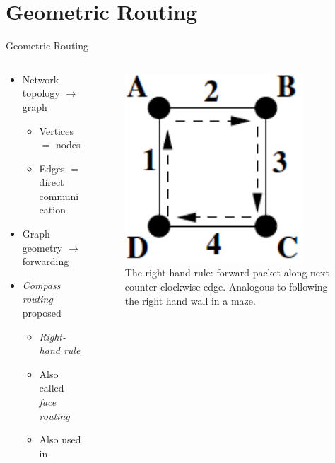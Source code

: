 \documentclass[pdftex]{beamer}
\begin{document}

\section{Geometric Routing}

\begin{frame}{Geometric Routing}
\begin{columns}
\begin{column}{.5\textwidth}
	\begin{itemize}
		\item Network topology $\rightarrow$ graph
			\begin{itemize}
				\item Vertices $=$ nodes
				\item Edges $=$ direct communication
			\end{itemize}
		\pause
		\item Graph geometry $\rightarrow$ forwarding
		\pause
		\item \emph{Compass routing} proposed \cite{Kranakis99compassrouting}
		\begin{itemize}
			\item \emph{Right-hand rule}
			\item Also called \emph{face routing}
			\item Also used in \cite{Kuhn2003, Kim:2005:GRM:1251203.1251219}
		\end{itemize}
\end{itemize}
\end{column}

\begin{column}{.5\textwidth}
\begin{figure}
\includegraphics[width=.5\textwidth]{right_hand_rule}
\caption{The right-hand rule: forward packet along next counter-clockwise edge. Analogous to following the right hand wall in a maze.}
\end{figure}
\end{column}
\end{columns}
\end{frame}
\end{document}
